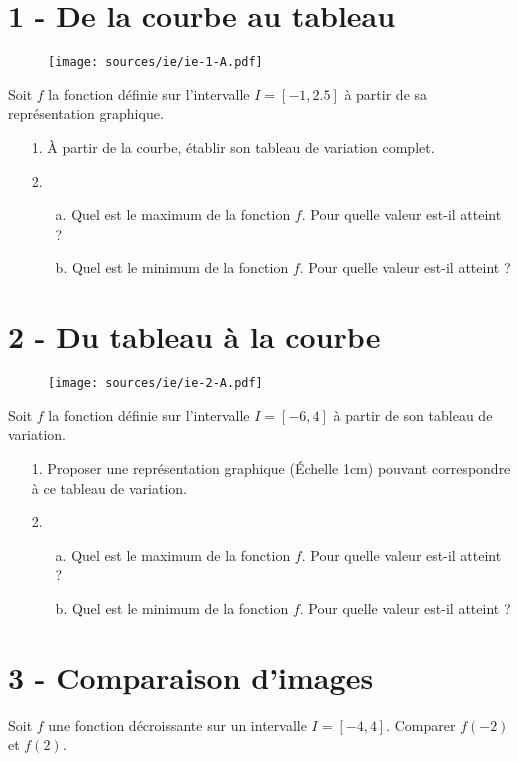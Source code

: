 \documentclass[10pt]{article}
\begin{document}
\begin{multicols}{2}
  \section*{1 - De la courbe au tableau}
  \begin{figure}[H]
    \centering
    \texttt{[image: sources/ie/ie-1-A.pdf]}
  \end{figure}

  Soit $f$ la fonction définie sur l'intervalle $I=[-1,2.5]$ à partir de sa représentation graphique.
  \begin{enumerate}
  \item[1.] À partir de la courbe, établir son tableau de variation complet.
  \item[2.]
    \begin{enumerate}
    \item[a.] Quel est le maximum de la fonction $f$. Pour quelle valeur est-il atteint ?
    \item[b.] Quel est le minimum de la fonction $f$. Pour quelle valeur est-il atteint ?
    \end{enumerate}
  \end{enumerate}

  \section*{2 - Du tableau à la courbe}

  \begin{figure}[H]
    \centering
    \texttt{[image: sources/ie/ie-2-A.pdf]}
  \end{figure}

  Soit $f$ la fonction définie sur l'intervalle $I=[-6,4]$ à partir de son tableau de variation.
  \begin{enumerate}
  \item[1.] Proposer une représentation graphique (Échelle 1cm) pouvant correspondre à ce tableau de variation.
  \item[2.]
    \begin{enumerate}
    \item[a.] Quel est le maximum de la fonction $f$. Pour quelle valeur est-il atteint ?
    \item[b.] Quel est le minimum de la fonction $f$. Pour quelle valeur est-il atteint ?
    \end{enumerate}
  \end{enumerate}

  \section*{3 - Comparaison d'images}

  Soit $f$ une fonction décroissante sur un intervalle $I=[-4,4]$. Comparer $f(-2)$ et $f(2)$.
\end{multicols}
\end{document}
